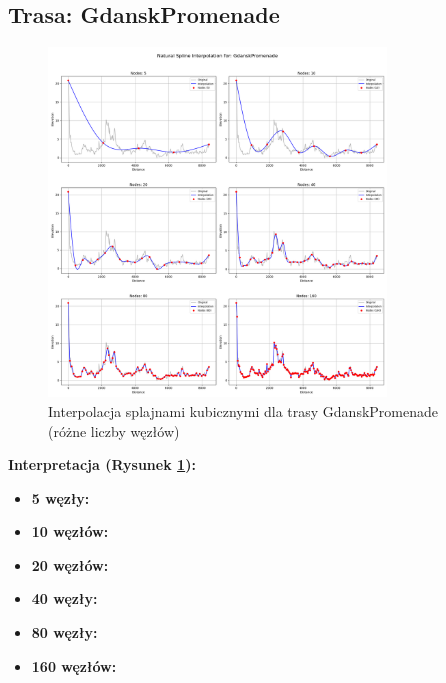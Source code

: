 \documentclass[11pt,a4paper]{article}
\begin{document}
\subsection{Trasa: GdanskPromenade}
\begin{figure}[H]
    \centering
    \includegraphics[width=0.8\textwidth]{plots/GdanskPromenade_Spline_basic.png}
    \caption{Interpolacja splajnami kubicznymi dla trasy GdanskPromenade (różne liczby węzłów)}
    \label{fig:promenade_splajny}
\end{figure}
\textbf{Interpretacja (Rysunek \ref{fig:promenade_splajny}):} 
\begin{itemize}
    \item \textbf{5 węzły:}
    \item \textbf{10 węzłów:}
    \item \textbf{20 węzłów:}
    \item \textbf{40 węzły:} 
    \item \textbf{80 węzły:} 
    \item \textbf{160 węzłów:} 
\end{itemize}
\end{document}

